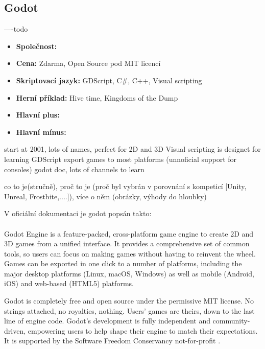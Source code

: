 \subsection{Godot}
----todo \linebreak
{}

\begin{itemize}
	\item \textbf{Společnost: }
	\item \textbf{Cena: } Zdarma,  Open Source pod MIT licencí
	\item \textbf{Skriptovací jazyk: } GDScript, C\#, C++, Visual scripting
	\item \textbf{Herní příklad: } Hive time, Kingdoms of the Dump
	\item \textbf{Hlavní plus: }
	\item \textbf{Hlavní mínus: }
\end{itemize}

start at 2001, lots of names, perfect for 2D and 3D
Visual scripting is designet for learning GDScript
export games to most platforms (unnoficial support for consoles)
godot doc, lots of channels to learn


co to je(stručně), proč to je (proč byl vybrán  v porovnání s kompeticí [Unity, Unreal, Frostbite,....]), více o  něm (obrázky, výhody do hloubky)

V oficiální dokumentaci je godot popsán takto:

\paragraph{}
Godot Engine is a feature-packed, cross-platform game engine to create 2D and 3D games from a unified interface. It provides a comprehensive set of common tools, so users can focus on making games without having to reinvent the wheel. Games can be exported in one click to a number of platforms, including the major desktop platforms (Linux, macOS, Windows) as well as mobile (Android, iOS) and web-based (HTML5) platforms.

Godot is completely free and open source under the permissive MIT license. No strings attached, no royalties, nothing. Users' games are theirs, down to the last line of engine code. Godot's development is fully independent and community-driven, empowering users to help shape their engine to match their expectations. It is supported by the Software Freedom Conservancy not-for-profit \cite{godot_introduction} .

